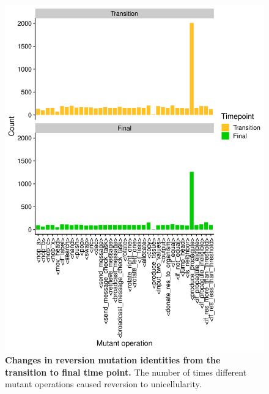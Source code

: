 \documentclass[
]{book}
\begin{document}
\begin{figure}
\centering
\includegraphics{images/Mutant_operations_at_transition_and_final_time_point_20DEC22.png}
\caption{\label{fig:reversion-mutation-identities}\textbf{Changes in reversion mutation identities from the transition to final time point.} The number of times different mutant operations caused reversion to unicellularity.}
\end{figure}
\end{document}
